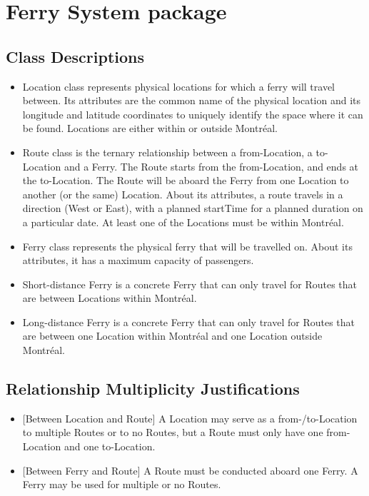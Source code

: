 \documentclass[letterpaper]{report}
\begin{document}
\section{Ferry System package}
\subsection{Class Descriptions}
\begin{itemize}
    \item Location class represents physical locations for which a ferry will travel between. Its attributes are the common name of the physical location and its longitude and latitude coordinates to uniquely identify the space where it can be found. Locations are either within or outside Montréal.
    \item Route class is the ternary relationship between a from-Location, a to-Location and a Ferry. The Route starts from the from-Location, and ends at the to-Location. The Route will be aboard the Ferry from one Location to another (or the same) Location. About its attributes, a route travels in a direction (West or East), with a planned startTime for a planned duration on a particular date. At least one of the Locations must be within Montréal.
    \item Ferry class represents the physical ferry that will be travelled on. About its attributes, it has a maximum capacity of passengers. 
    \item Short-distance Ferry is a concrete Ferry that can only travel for Routes that are between Locations within Montréal.
    \item Long-distance Ferry is a concrete Ferry that can only travel for Routes that are between one Location within Montréal and one Location outside Montréal.
\end{itemize}

\subsection{Relationship Multiplicity Justifications}
\begin{itemize}
    \item {[Between Location and Route]} A Location may serve as a from-/to-Location to multiple Routes or to no Routes, but a Route must only have one from-Location and one to-Location.
    \item {[Between Ferry and Route]} A Route must be conducted aboard one Ferry. A Ferry may be used for multiple or no Routes.
\end{itemize}
\end{document}
